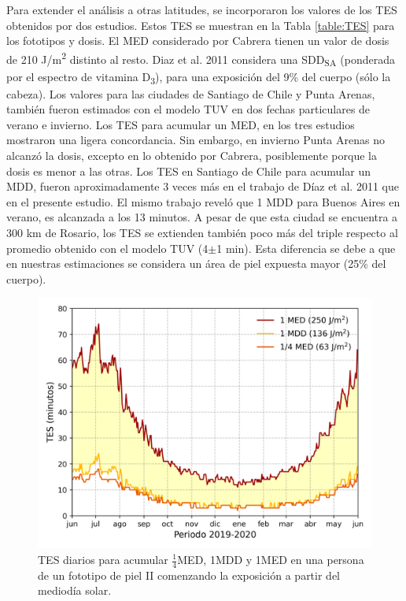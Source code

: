 \documentclass[10pt,twocolumn]{article}
\begin{document}
Para extender el análisis a otras latitudes, se incorporaron los valores de los TES obtenidos por dos estudios\cite{Diaz2011,cabrera_radiacion_2005}. Estos TES se muestran en la Tabla \ref{table:TES} para los fototipos y dosis. El MED considerado por Cabrera\cite{cabrera_radiacion_2005} tienen un valor de dosis de 210 J/m\textsuperscript{2} distinto al resto. Diaz et al. 2011 considera una SDD\textsubscript{SA} (ponderada por el espectro de vitamina D\textsubscript{3}), para una exposición del 9\% del cuerpo (sólo la cabeza). Los valores para las ciudades de Santiago de Chile y Punta Arenas, también fueron estimados con el modelo TUV en dos fechas particulares de verano e invierno. Los TES para acumular un MED, en los tres estudios mostraron una ligera concordancia. Sin embargo, en invierno Punta Arenas no alcanzó la dosis, excepto en lo obtenido por Cabrera, posiblemente porque la dosis es menor a las otras. Los TES en Santiago de Chile para acumular un MDD, fueron aproximadamente 3 veces más en el trabajo de Díaz et al. 2011 que en el presente estudio. El mismo trabajo reveló que 1 MDD para Buenos Aires en verano, es alcanzada a los 13 minutos. A pesar de que esta ciudad se encuentra a 300 km de Rosario, los TES se extienden también poco más del triple respecto al promedio obtenido con el modelo TUV (4$\pm$1 min). Esta diferencia se debe a que en nuestras estimaciones se considera un área de piel expuesta mayor (25\% del cuerpo).

\begin{figure}[ht]
  \centering
  \includegraphics[scale=0.47]{dosis_vitamin.png}
  \caption{TES diarios para acumular $\frac{1}{4}$MED, 1MDD y 1MED en una persona de un fototipo de piel II comenzando la exposición a partir del mediodía solar.}
  \label{fig:TES}
\end{figure}
\end{document}
